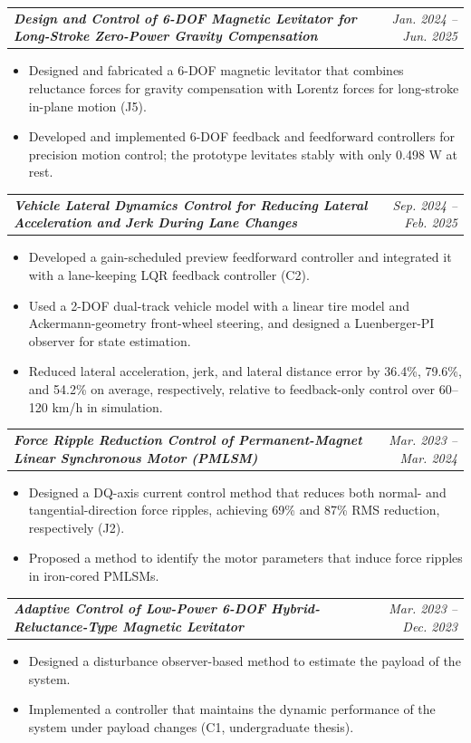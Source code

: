 \documentclass[10pt,letterpaper]{article}
\makeatletter
\newcommand{\project}[2]{\vspace{2pt}\begin{tabularx}{\textwidth}{@{}>{\raggedright\arraybackslash}X r@{}}\textbf{\textit{#1}} & \textit{#2}\end{tabularx}\par\nopagebreak}
\makeatother
\begin{document}
\project{Design and Control of 6-DOF Magnetic Levitator for Long-Stroke Zero-Power Gravity Compensation}{Jan. 2024 -- Jun. 2025}
\begin{itemize}
  \item Designed and fabricated a 6-DOF magnetic levitator that combines reluctance forces for gravity compensation with Lorentz forces for long-stroke in-plane motion (J5).
  \item Developed and implemented 6-DOF feedback and feedforward controllers for precision motion control; the prototype levitates stably with only 0.498 W at rest.
\end{itemize}

\project{Vehicle Lateral Dynamics Control for Reducing Lateral Acceleration and Jerk During Lane Changes}{Sep. 2024 -- Feb. 2025}
\begin{itemize}
  \item Developed a gain-scheduled preview feedforward controller and integrated it with a lane-keeping LQR feedback controller (C2).
  \item Used a 2-DOF dual-track vehicle model with a linear tire model and Ackermann-geometry front-wheel steering, and designed a Luenberger-PI observer for state estimation.
  \item Reduced lateral acceleration, jerk, and lateral distance error by 36.4\%, 79.6\%, and 54.2\% on average, respectively, relative to feedback-only control over 60--120 km/h in simulation.
\end{itemize}

\project{Force Ripple Reduction Control of Permanent-Magnet Linear Synchronous Motor (PMLSM)}{Mar. 2023 -- Mar. 2024}
\begin{itemize}
  \item Designed a DQ-axis current control method that reduces both normal- and tangential-direction force ripples, achieving 69\% and 87\% RMS reduction, respectively (J2).
  \item Proposed a method to identify the motor parameters that induce force ripples in iron-cored PMLSMs.
\end{itemize}

\project{Adaptive Control of Low-Power 6-DOF Hybrid-Reluctance-Type Magnetic Levitator}{Mar. 2023 -- Dec. 2023}
\begin{itemize}
  \item Designed a disturbance observer-based method to estimate the payload of the system.
  \item Implemented a controller that maintains the dynamic performance of the system under payload changes (C1, undergraduate thesis).
\end{itemize}
\end{document}
